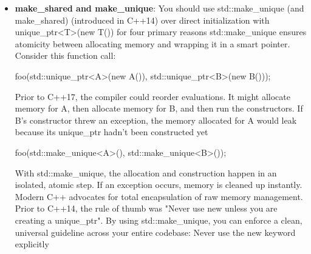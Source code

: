 \documentclass{report}
\begin{document}
\begin{itemize}
\begin{itemize}
\begin{cppcode}
                        auto widget = std::make_shared<Widget>();
                        auto another_owner = widget->get_pointer();
                    \end{cppcode}
                    \bigbreak \noindent 
                    Do not construct a new shared\_ptr from this:
                    \bigbreak \noindent 
                    \begin{cppcode}
                    std::shared_ptr<Widget>(this); // Dangerous
                    \end{cppcode}
                    \bigbreak \noindent 
                    That creates a separate control block and can cause double deletion. shared\_from\_this() requires the object to already be managed by an appropriate shared\_ptr. Otherwise, it throws std::bad\_weak\_ptr.
                    \bigbreak \noindent 
                    C++ 17 also provides
                    \bigbreak \noindent 
                    \begin{cppcode}
                    std::weak_ptr<Widget> weak = weak_from_this();
                    \end{cppcode}

            \end{itemize}
        \item \textbf{make\_shared and make\_unique}: You should use std::make\_unique (and make\_shared) (introduced in C++14) over direct initialization with unique\_ptr<T>(new T()) for four primary reasons
            \bigbreak \noindent 
            std::make\_unique ensures atomicity between allocating memory and wrapping it in a smart pointer. Consider this function call:
            \bigbreak \noindent 
            \begin{cppcode}
            foo(std::unique_ptr<A>(new A()), std::unique_ptr<B>(new B()));
            \end{cppcode}
            \bigbreak \noindent 
            Prior to C++17, the compiler could reorder evaluations. It might allocate memory for A, then allocate memory for B, and then run the constructors. If B's constructor threw an exception, the memory allocated for A would leak because its unique\_ptr hadn't been constructed yet
            \bigbreak \noindent 
            \begin{cppcode}
            foo(std::make_unique<A>(), std::make_unique<B>());
            \end{cppcode}
            \bigbreak \noindent 
            With std::make\_unique, the allocation and construction happen in an isolated, atomic step. If an exception occurs, memory is cleaned up instantly.
            \bigbreak \noindent 
            Modern C++ advocates for total encapsulation of raw memory management. Prior to C++14, the rule of thumb was "Never use new unless you are creating a unique\_ptr". By using std::make\_unique, you can enforce a clean, universal guideline across your entire codebase: Never use the new keyword explicitly



    \end{itemize}
\end{document}
